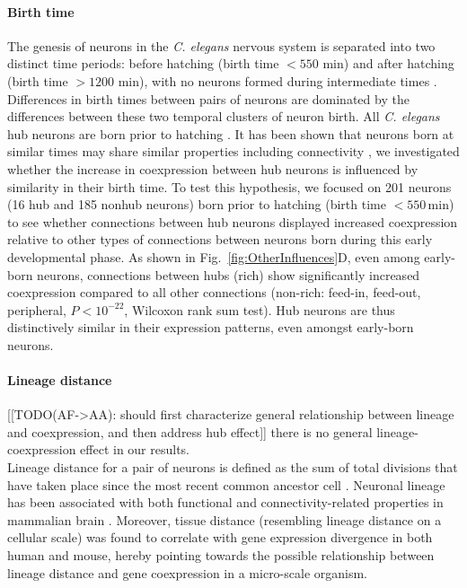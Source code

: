 \documentclass[10pt,letterpaper]{article}
\begin{document}
\paragraph{Birth time}
The genesis of neurons in the \emph{C. elegans} nervous system is separated into two distinct time periods: before hatching (birth time $<550$ min) and after hatching (birth time $>1200$ min), with no neurons formed during intermediate times \cite{Varier2011}.
Differences in birth times between pairs of neurons are dominated by the differences between these two temporal clusters of neuron birth.
All \emph{C. elegans} hub neurons are born prior to hatching \cite{Varier2011, Towlson2013}.
It has been shown that neurons born at similar times may share similar properties including connectivity \cite{Schroter:2017eo}, we investigated whether the increase in coexpression between hub neurons is influenced by similarity in their birth time.
To test this hypothesis, we focused on 201 neurons (16 hub and 185 nonhub neurons) born prior to hatching (birth time $<550$\,min) to see whether connections between hub neurons displayed increased coexpression relative to other types of connections between neurons born during this early developmental phase.
As shown in Fig.~\ref{fig:OtherInfluences}D, even among early-born neurons, connections between hubs (rich) show significantly increased coexpression compared to all other connections (non-rich: feed-in, feed-out, peripheral, $P < 10^{-22}$, Wilcoxon rank sum test).
Hub neurons are thus distinctively similar in their expression patterns, even amongst early-born neurons.


\paragraph{Lineage distance}
[[TODO(AF->AA): should first characterize general relationship between lineage and coexpression, and then address hub effect]] there is no general lineage-coexpression effect in our results.\\
Lineage distance for a pair of neurons is defined as the sum of total divisions that have taken place since the most recent common ancestor cell \cite{Pavlovic:2014gx, Sulston1977, Sulston1983}.
Neuronal lineage has been associated with both functional and connectivity-related properties in mammalian brain \cite{Ciceri2013,Li2012,Yu2012}.
Moreover, tissue distance (resembling lineage distance on a cellular scale) was found to correlate with gene expression divergence \cite{Cui2007} in both human and mouse, hereby pointing towards the possible relationship between lineage distance and gene coexpression in a micro-scale organism.
\end{document}
